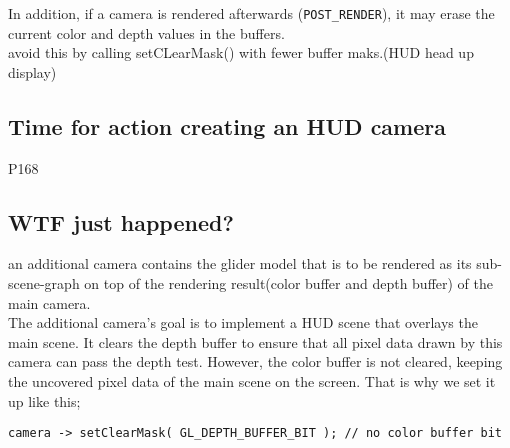 \documentclass[a4paper,12pt]{book}
\begin{document}
In addition, if a camera is rendered afterwards (\verb|POST_RENDER|), it may erase the current color and depth values in the buffers.\\
\textrightarrow avoid this by calling setCLearMask() with fewer buffer maks.(HUD head up display)

\subsection{Time for action creating an HUD camera}
P168

\subsection{WTF just happened?}
an additional camera contains the glider model that is to be rendered as its sub-scene-graph on top of the rendering result(color buffer and depth buffer) of the main camera.\\
The additional camera's goal is to implement a HUD scene that overlays the main scene. It clears the depth buffer to ensure that all pixel data drawn by this camera can pass the depth test. However, the color buffer is not cleared, keeping the uncovered pixel data of the main scene on the screen. That is why we set it up like this;
\begin{lstlisting}
camera -> setClearMask( GL_DEPTH_BUFFER_BIT ); // no color buffer bit
\end{lstlisting}
\end{document}
